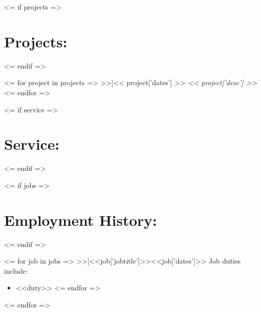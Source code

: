\documentclass{resume}
\begin{document}
\begin{comment}

New section, trying it out
Currently canning this section but THAT'S OKAY
\section*{\underline{\textit{Projects:}}}
\large\textit{Super Four-Bar Explorer \hfill December 2008}\normalsize
\small\begin{itemize}
\item A program written in python that uses a Gauss-Newton unconstrained optimization algorithm to fit the path traced by a four bar linkage to a given set of points
\item Accompanied by a spreadsheet that illustrates four-bar linkage traced paths
\end{itemize}\normalsize\medskip

Another new section, recommended by Career Services. At worst, I have the
wording for it, amirite?
\section*{\underline{\textit{Service:}}}
\tiny\begin{enumerate}
\item Administered the web site and Facebook page for ASME's UAF student chapter \hfill 2009--2010
\item Volunteered at the UAF College of Engineering and Mines' Engineer's Week Open House \hfill February 2010
\end{enumerate}\normalsize

\large\textit{Society of Automotive Engineers, UAF
Chapter\hfill2009}\normalsize\\
\textit{Treasurer}
\end{comment}

<= if projects =>
    \section{Projects:}
<= endif =>

<= for project in projects =>
    \affiliation[<< project['title'] >>]{<< project['dates'] >>}
    \textit{<< project['desc'] >>}
<= endfor =>

<= if service =>
    \section{Service:}
<= endif =>

<= if jobs =>
    \section{Employment History:}
<= endif =>

<= for job in jobs =>
    \affiliation[<<job['employername']>>]{<<job['jobtitle']>>}{<<job['dates']>>}\normalsize
    Job duties include:
    \small\begin{itemize}
    <= for duty in job['duties'] =>
        \item <<duty>>
    <= endfor =>
    \end{itemize}\normalsize
    \medskip
<= endfor =>
\end{document}
